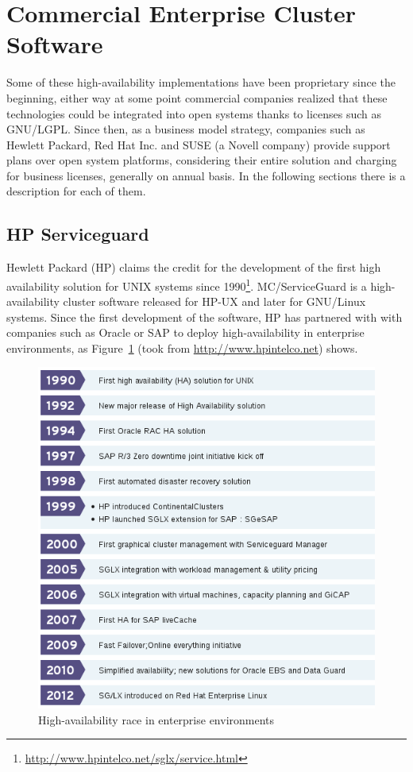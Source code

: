 \documentclass[a4paper, 12pt]{book}
\begin{document}
\section{Commercial Enterprise Cluster Software}
\label{sec:enterprise}

Some of these high-availability implementations have been proprietary since the beginning, either way at some point commercial companies realized that these technologies could be integrated into open systems thanks to licenses such as GNU/LGPL. Since then, as a business model strategy, companies such as Hewlett Packard, Red Hat Inc. and SUSE (a Novell company) provide support plans over open system platforms, considering their entire solution and charging for business licenses, generally on annual basis. In the following sections there is a description for each of them.

\subsection{HP Serviceguard}
\label{subsec:serviceguard}

Hewlett Packard (HP) claims the credit for the development of the first high availability solution for UNIX systems since 1990\footnote{\url{http://www.hpintelco.net/sglx/service.html}}. MC/ServiceGuard is a high-availability cluster software released for HP-UX and later for GNU/Linux systems. Since the first development of the software, HP has partnered with with companies such as Oracle or SAP to deploy high-availability in enterprise environments, as Figure~\ref{fig:enterprise} (took from \url{http://www.hpintelco.net}) shows.\bigskip

\begin{figure}
  \centering
  \includegraphics[scale=0.70]{commercial-ha.png}
  \caption[High-availability race in enterprise environments]{High-availability race in enterprise environments}
  \label{fig:enterprise}
\end{figure}
\end{document}

